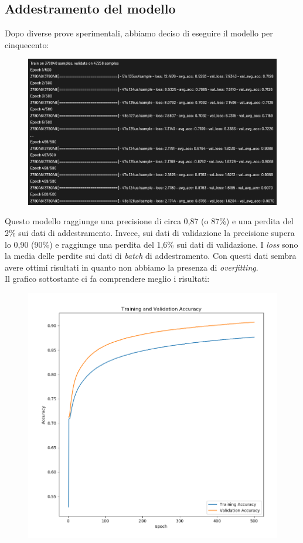 \subsection{Addestramento del modello}
Dopo diverse prove sperimentali, abbiamo deciso di eseguire il modello per cinquecento:
\begin{figure}[H]
	\centering
	\includegraphics[scale=0.8]{./images/storia.png}
\end{figure}
Questo modello raggiunge una precisione di circa 0,87 (o 87\%) e una perdita del 2\% sui dati di addestramento. Invece, sui dati di validazione la precisione supera lo 0,90 (90\%) e raggiunge una perdita del 1,6\% sui dati di validazione. I \textit{loss} sono la media delle perdite sui dati di \textit{batch} di addestramento. Con questi dati sembra avere ottimi risultati in quanto non abbiamo la presenza di \textit{overfitting}.\\
\newline
Il grafico sottostante ci fa comprendere meglio i risultati:
\begin{figure}[H]
	\centering
	\includegraphics[scale=0.35]{./images/plot.png}
\end{figure}
